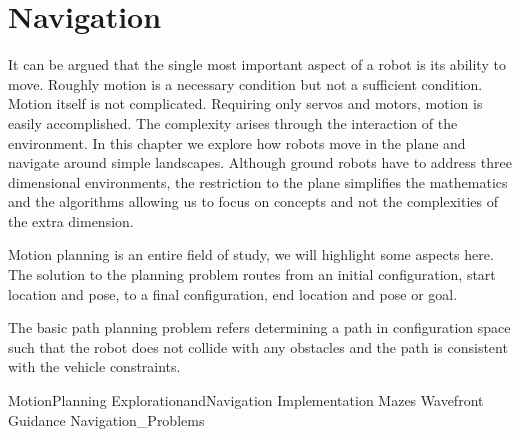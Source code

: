 \hypertarget{Chap:Navigation}{%
\section{Navigation}\label{Chap:Navigation}}

It can be argued that the single most important aspect of a robot is its
ability to move. Roughly motion is a necessary condition but not a
sufficient condition. Motion itself is not complicated. Requiring only
servos and motors, motion is easily accomplished. The complexity arises
through the interaction of the environment. In this chapter we explore
how robots move in the plane and navigate around simple landscapes.
Although ground robots have to address three dimensional environments,
the restriction to the plane simplifies the mathematics and the
algorithms allowing us to focus on concepts and not the complexities of
the extra dimension.

Motion planning is an entire field of study, we will highlight some
aspects here. The solution to the planning problem routes from an
initial configuration, start location and pose, to a final
configuration, end location and pose or goal.

The basic path planning problem refers determining a path in
configuration space such that the robot does not collide with any
obstacles and the path is consistent with the vehicle constraints.

MotionPlanning ExplorationandNavigation Implementation Mazes Wavefront
Guidance Navigation\_Problems

